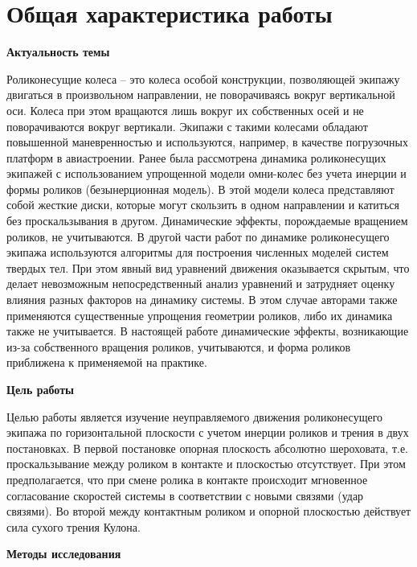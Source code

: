 
\section*{Общая характеристика работы}

\textbf{Актуальность темы}

Роликонесущие колеса – это колеса особой конструкции, позволяющей экипажу двигаться в произвольном направлении, не поворачиваясь вокруг вертикальной оси. Колеса при этом вращаются лишь вокруг их собственных осей и не поворачиваются вокруг вертикали. Экипажи с такими колесами обладают повышенной маневренностью и используются, например, в качестве погрузочных платформ в авиастроении.
Ранее была рассмотрена динамика роликонесущих экипажей с использованием упрощенной модели омни-колес без учета инерции и формы роликов (безынерционная модель). В этой модели колеса  представляют собой жесткие диски, которые могут скользить в одном направлении и катиться без проскальзывания в другом. Динамические эффекты, порождаемые вращением роликов, не учитываются. В другой части работ по динамике роликонесущего экипажа используются  алгоритмы для построения численных моделей систем твердых тел. При этом явный вид уравнений движения оказывается скрытым, что делает невозможным непосредственный анализ уравнений и затрудняет оценку влияния разных факторов на динамику системы. В этом случае авторами также применяются существенные упрощения геометрии роликов, либо их динамика также не учитывается.
В настоящей работе динамические эффекты, возникающие из-за собственного вращения роликов, учитываются, и форма роликов приближена к применяемой на практике.

\textbf{Цель работы}

Целью работы является изучение неуправляемого движения роликонесущего экипажа по горизонтальной плоскости с учетом инерции роликов и трения в двух постановках. В первой постановке опорная плоскость абсолютно шероховата, т.е. проскальзывание между роликом в контакте и плоскостью отсутствует. При этом предполагается, что при смене ролика в контакте происходит мгновенное согласование скоростей системы в соответствии с новыми связями (удар связями). Во второй между контактным роликом и опорной плоскостью действует сила сухого трения Кулона. 

\textbf{Методы исследования}

